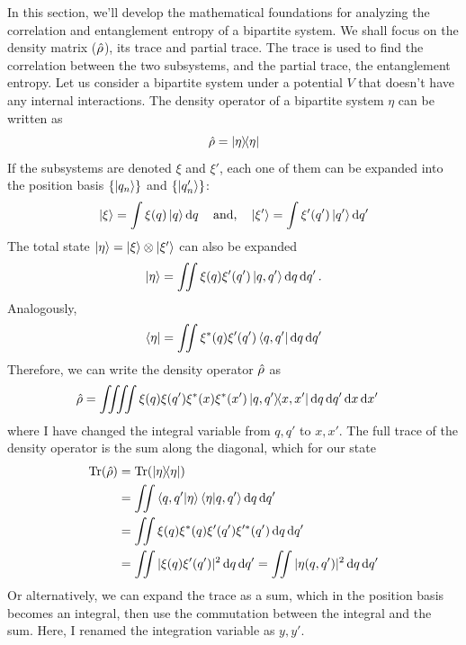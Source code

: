 In this section, we'll develop the mathematical foundations for analyzing the correlation and entanglement entropy of a bipartite system. We shall focus on the density matrix ($\hat{\rho}$), its trace and partial trace. The trace is used to find the correlation between the two subsystems, and the partial trace, the entanglement entropy. Let us consider a bipartite system under a potential $V$ that doesn't have any internal interactions. The density operator of a bipartite system $\eta$ can be written as
\begin{equation}
    \hat{\rho} = \ketbra{\eta}
\end{equation}
If the subsystems are denoted $\xi$ and $\xi'$, each one of them can be expanded into the position basis $\{\ket{q_n}\}$ and $\{\ket{q_n'}\}$:
\begin{gather}
    \ket{\xi} = \int\xi(q)\ket{q}\dd{q} \quad\textrm{and,}\quad \ket{\xi'} = \int\xi'(q')\ket{q'}\dd{q'}
\end{gather}
The total state $\ket{\eta} = \ket{\xi}\otimes\ket{\xi'}$ can also be expanded
\begin{equation}
    \ket{\eta} = \iint\xi(q)\xi'(q')\ket{q, q'}\dd{q}\dd{q'}.
\end{equation}
Analogously,
\begin{equation}
    \bra{\eta} = \iint\xi^{\ast}(q)\xi'(q')\bra{q, q'}\dd{q}\dd{q'}
\end{equation}
Therefore, we can write the density operator $\hat{\rho}$ as
\begin{align}
    \hat{\rho} &= \iiiint\xi(q)\xi(q')\xi^{\ast}(x)\xi^{\ast}(x')\ketbra{q, q'}{x, x'}\dd{q}\dd{q'}\dd{x}\dd{x'}
\end{align}
where I have changed the integral variable from $q, q'$ to $x, x'$. The full trace of the density operator is the sum along the diagonal, which for our state 
\begin{align}
    \Tr(\hat{\rho}) &= \Tr(\ketbra{\eta}) \\
    &= \iint\braket{q, q'}{\eta}\braket{\eta}{q, q'}\dd{q}\dd{q'} \\
    &= \iint\xi(q)\xi^{\ast}(q)\xi'(q')\xi^{\prime\ast}(q')\dd{q}\dd{q'} \\
    &= \iint|\xi(q)\xi'(q')|^2\dd{q}\dd{q'} = \iint|\eta(q, q')|^2\dd{q}\dd{q'}
\end{align}
Or alternatively, we can expand the trace as a sum, which in the position basis becomes an integral, then use the commutation between the integral and the sum. Here, I renamed the integration variable as $y, y'$.
